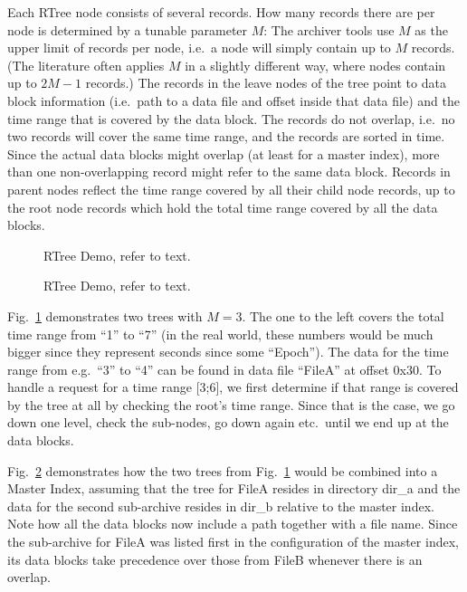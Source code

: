 Each RTree node consists of several records. How many records there are
per node is determined by a tunable parameter $M$:
The archiver tools use $M$ as the upper limit of records
per node, i.e.\ a node will simply contain up to $M$ records.
(The literature often applies $M$ in a slightly different way,
where nodes contain up to $2M-1$ records.)
The records in the leave nodes of the tree point to data block
information (i.e.\ path to a data file and offset inside that data
file) and the time range that is covered by the data block.
The records do not overlap, i.e.\ no two records will cover the same
time range, and the records are sorted in time.
Since the actual data blocks might overlap (at least for a master index), more
than one non-overlapping record might refer to the same data block.
Records in parent nodes reflect the time range covered by all their
child node records, up to the root node records which hold the total
time range covered by all the data blocks.

\begin{figure}[htb]
\begin{center}
\end{center}
\caption{\label{fig:indices}RTree Demo, refer to text.}
\end{figure}

\begin{figure}[htb]
\begin{center}
\end{center}
\caption{\label{fig:masterindex}RTree Demo, refer to text.}
\end{figure}

Fig.~\ref{fig:indices} demonstrates two trees with $M=3$. The one to the left
covers the total time range from ``1'' to ``7'' (in the real world,
these numbers would be much bigger since they represent seconds since
some ``Epoch'').  The data for the time range from e.g.\ ``3'' to
``4'' can be found in data file ``FileA'' at offset 0x30. To handle a
request for a time range [3;6], we first determine if that range is
covered by the tree at all by checking the root's time range. Since
that is the case, we go down one level, check the sub-nodes, go down
again etc.\ until we end up at the data blocks.

Fig.~\ref{fig:masterindex} demonstrates how the two trees from
Fig.~\ref{fig:indices} would be combined into a Master Index, assuming
that the tree for FileA resides in directory dir\_a and the data for
the second sub-archive resides in dir\_b relative to the master index.
Note how all the data blocks now include a path together with a file
name. Since the sub-archive for FileA was listed first in the
configuration of the master index, its data blocks take precedence
over those from FileB whenever there is an overlap.

